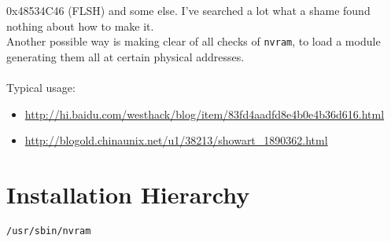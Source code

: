 \documentclass[a4paper]{report}
\begin{document}
\begin{enumerate}
0x48534C46 (FLSH) and some else. I've searched a lot what a shame found nothing about
how to make it.\\
Another possible way is making clear of all checks of {\tt nvram}, to load a module
generating them all at certain physical addresses.\\\\
Typical usage:\\
\begin{itemize}
    \item \url{http://hi.baidu.com/westhack/blog/item/83fd4aadfd8e4b0e4b36d616.html}
    \item \url{http://blogold.chinaunix.net/u1/38213/showart\_1890362.html}
\end{itemize}
\section{Installation Hierarchy}
\begin{lstlisting}
/usr/sbin/nvram
\end{lstlisting}




\end{enumerate}
\end{document}
